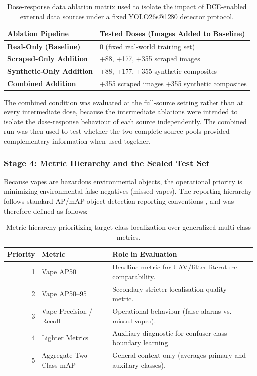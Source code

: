 \begin{table}[H]
\centering
\small
\renewcommand{\arraystretch}{1.2}
\begin{tabularx}{\textwidth}{@{} l X @{}}
\toprule
\textbf{Ablation Pipeline} & \textbf{Tested Doses (Images Added to Baseline)} \\
\midrule
\textbf{Real-Only (Baseline)} & 0 (fixed real-world training set) \\
\textbf{Scraped-Only Addition} & +88, +177, +355 scraped images \\
\textbf{Synthetic-Only Addition} & +88, +177, +355 synthetic composites \\
\textbf{Combined Addition} & +355 scraped images +355 synthetic composites \\
\bottomrule
\end{tabularx}
\caption{Dose-response data ablation matrix used to isolate the impact of DCE-enabled external data sources under a fixed YOLO26s@1280 detector protocol.}
\label{tab:data_ablation_matrix}
\end{table}

The combined condition was evaluated at the full-source setting rather than at every intermediate dose, because the intermediate ablations were intended to isolate the dose-response behaviour of each source independently. The combined run was then used to test whether the two complete source pools provided complementary information when used together.

\subsubsection{Stage 4: Metric Hierarchy and the Sealed Test Set}

Because vapes are hazardous environmental objects, the operational priority is minimizing environmental false negatives (missed vapes). The reporting hierarchy follows standard AP/mAP object-detection reporting conventions \cite{lin2014coco,ultralytics_metrics_docs}, and was therefore defined as follows:

\begin{table}[H]
\centering
\small
\renewcommand{\arraystretch}{1.2}
\begin{tabularx}{\textwidth}{@{} r p{} X @{}}
\toprule
\textbf{Priority} & \textbf{Metric} & \textbf{Role in Evaluation} \\
\midrule
1 & Vape AP50 & Headline metric for UAV/litter literature comparability. \\
2 & Vape AP50--95 & Secondary stricter localisation-quality metric. \\
3 & Vape Precision / Recall & Operational behaviour (false alarms vs. missed vapes). \\
4 & Lighter Metrics & Auxiliary diagnostic for confuser-class boundary learning. \\
5 & Aggregate Two-Class mAP & General context only (averages primary and auxiliary classes). \\
\bottomrule
\end{tabularx}
\caption{Metric hierarchy prioritizing target-class localization over generalized multi-class metrics.}
\label{tab:uavape_metric_hierarchy}
\end{table}

